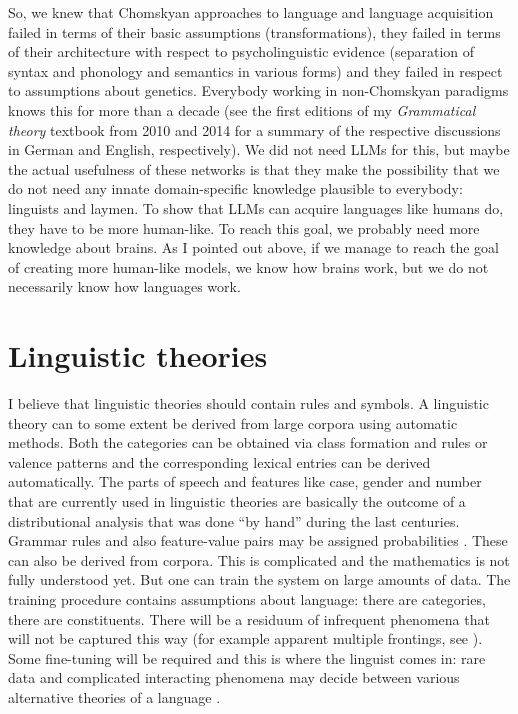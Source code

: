 So, we knew that Chomskyan approaches to language and language acquisition failed in terms of their
basic assumptions (transformations), they failed in terms of their architecture with respect to
psycholinguistic evidence (separation of syntax and phonology and semantics in various forms) and
they failed in respect to assumptions about genetics. Everybody working in non-Chomskyan paradigms
knows this for more than a decade (see the first editions of my \emph{Grammatical theory} textbook
from 2010 and 2014 for a summary of the
respective discussions in German and English, respectively). We did not need LLMs for this, but maybe the actual usefulness of these networks is that
they make the possibility that we do not need any innate domain-specific knowledge plausible to
everybody: linguists and laymen. To show that LLMs can acquire languages like humans do, they have
to be more human-like. To reach this goal, we probably need more knowledge about brains. As I
pointed out above, if we manage to reach the goal of creating more human-like models, we know how
brains work, but we do not necessarily know how languages work.

\section{Linguistic theories}

I believe that linguistic theories should contain rules and symbols. A linguistic theory can to some
extent be derived from large corpora using automatic methods. Both the categories can be obtained
via class formation and rules or valence patterns and the corresponding lexical entries can be
derived automatically. The parts of speech and features like case, gender and
number that are currently used in linguistic theories are basically the outcome of a distributional
analysis that was done ``by hand'' during the last centuries. Grammar rules and also feature-value
pairs may be assigned probabilities \citep{Jurafsky96a}. These can also be derived from corpora. This is complicated and
the mathematics is not fully understood yet. But one can train the system on large amounts of
data. The training procedure contains assumptions about language: there are categories, there are
constituents. There will be a residuum of infrequent phenomena that will not be captured
this way (for example apparent multiple frontings, see \citealt{Mueller2003b}). Some fine-tuning will be
required and this is where the linguist comes in: rare data and complicated interacting phenomena may decide between various alternative
theories of a language \citep[Chapter~6]{MuellerGS}. 

